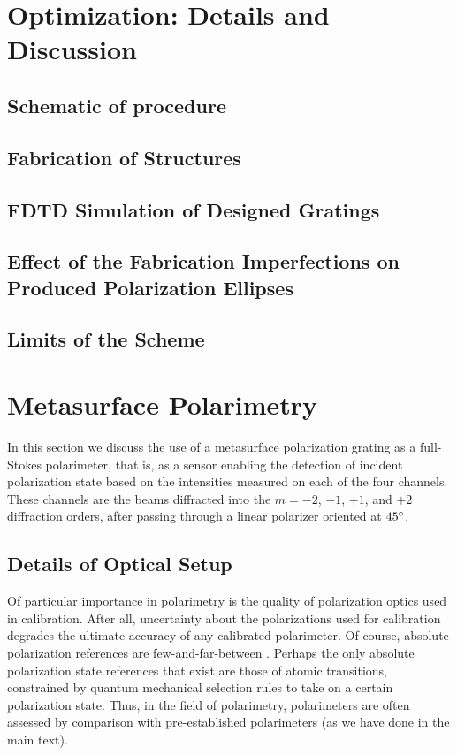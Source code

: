 \documentclass[footinbib,aps,prl,superscriptaddress]{revtex4-1}
\begin{document}
\tableofcontents


\section{Optimization: Details and Discussion}

\subsection{Schematic of procedure}

\subsection{Fabrication of Structures}

\subsection{FDTD Simulation of Designed Gratings}

\subsection{Effect of the Fabrication Imperfections on Produced Polarization Ellipses}

\subsection{Limits of the Scheme}

\section{Metasurface Polarimetry}

In this section we discuss the use of a metasurface polarization grating as a full-Stokes polarimeter, that is, as a sensor enabling the detection of incident polarization state based on the intensities measured on each of the four channels. These channels are the beams diffracted into the $m = -2$, $-1$, $+1$, and $+2$ diffraction orders, after passing through a linear polarizer oriented at $45\degree$.

\subsection{Details of Optical Setup}

Of particular importance in polarimetry is the quality of polarization optics used in calibration. After all, uncertainty about the polarizations used for calibration degrades the ultimate accuracy of any calibrated polarimeter. Of course, absolute polarization references are few-and-far-between \cite{Snik2014}. Perhaps the only absolute polarization state references that exist are those of atomic transitions, constrained by quantum mechanical selection rules to take on a certain polarization state. Thus, in the field of polarimetry, polarimeters are often assessed by comparison with pre-established polarimeters (as we have done in the main text).
\end{document}
